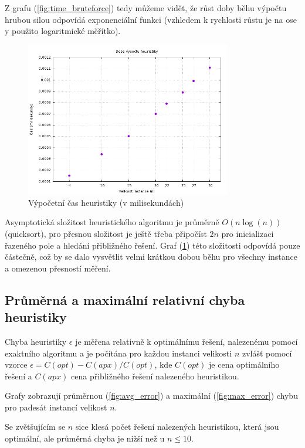 \documentclass[11pt]{article}
\begin{document}
Z grafu (\ref{fig:time_bruteforce}) tedy můžeme vidět, že růst doby běhu výpočtu hrubou silou odpovídá exponenciální funkci (vzhledem k rychlosti růstu je na ose y použito logaritmické měřítko).

\begin{figure}[h!]
	\centering
    	\includegraphics[width=0.8\textwidth]{time_greedy.png}
    	\caption{Výpočetní čas heuristiky (v milisekundách)}
	\label{fig:time_greedy}
\end{figure}

Asymptotická složitost heuristického algoritmu je průměrně $O(n\log(n))$ (quicksort), pro přesnou složitost je ještě třeba připočíst $2n$ pro inicializaci řazeného pole a hledání přibližného řešení. Graf (\ref{fig:time_greedy}) této složitosti odpovídá pouze částečně, což by se dalo vysvětlit velmi krátkou dobou běhu pro všechny instance a omezenou přesností měření.

\subsection{Průměrná a maximální relativní chyba heuristiky}

Chyba heuristiky $\epsilon$ je měřena relativně k optimálnímu řešení, nalezenému pomocí exaktního algoritmu a je počítána pro každou instanci velikosti $n$ zvlášť pomocí vzorce $\epsilon = C(opt) - C(apx) / C(opt)$, kde $C(opt)$ je cena optimálního řešení a $C(apx)$ cena přibližného řešení nalezeného heuristikou.

Grafy zobrazují průměrnou (\ref{fig:avg_error}) a maximální (\ref{fig:max_error}) chybu pro padesát instancí velikost $n$.

Se zvětšujícím se $n$ sice klesá počet řešení nalezených heuristikou, která jsou optimální, ale průměrná chyba je nižší než u $n \leq 10$.
\end{document}
